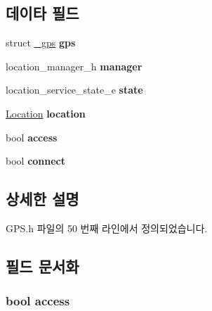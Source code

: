\subsection*{데이타 필드}
\begin{DoxyCompactItemize}
\item 
\hypertarget{struct_g_p_s_extends_ab3ecc8b2ec37f482acf1ac0c1a3d5e4e}{struct \hyperlink{struct__gps}{\-\_\-gps} {\bfseries gps}}\label{struct_g_p_s_extends_ab3ecc8b2ec37f482acf1ac0c1a3d5e4e}

\item 
\hypertarget{struct_g_p_s_extends_a3454051e15c896bc1d5271d43c810958}{location\-\_\-manager\-\_\-h {\bfseries manager}}\label{struct_g_p_s_extends_a3454051e15c896bc1d5271d43c810958}

\item 
\hypertarget{struct_g_p_s_extends_ad003a392ffec4bbd3a2839bb4e042e56}{location\-\_\-service\-\_\-state\-\_\-e {\bfseries state}}\label{struct_g_p_s_extends_ad003a392ffec4bbd3a2839bb4e042e56}

\item 
\hypertarget{struct_g_p_s_extends_a260defa82d536dcea2aa22452b862110}{\hyperlink{struct__location}{Location} {\bfseries location}}\label{struct_g_p_s_extends_a260defa82d536dcea2aa22452b862110}

\item 
\hypertarget{struct_g_p_s_extends_ab4e2372937bb1eec89f2a954a4db6604}{bool {\bfseries access}}\label{struct_g_p_s_extends_ab4e2372937bb1eec89f2a954a4db6604}

\item 
\hypertarget{struct_g_p_s_extends_af4e68d5926444b7651a9095ee0b26e48}{bool {\bfseries connect}}\label{struct_g_p_s_extends_af4e68d5926444b7651a9095ee0b26e48}

\end{DoxyCompactItemize}


\subsection{상세한 설명}


G\-P\-S.\-h 파일의 50 번째 라인에서 정의되었습니다.



\subsection{필드 문서화}
\hypertarget{struct_g_p_s_extends_ab4e2372937bb1eec89f2a954a4db6604}{
\subsubsection[{access}]{\setlength{\rightskip}{0pt plus 5cm}bool access}}\label{struct_g_p_s_extends_ab4e2372937bb1eec89f2a954a4db6604}


